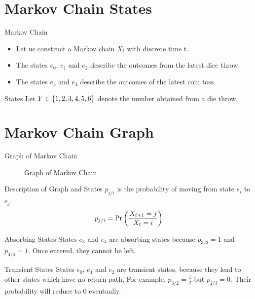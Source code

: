 \documentclass{beamer}
\begin{document}
\section{Markov Chain States}
\begin{frame}{Markov Chain}
\begin{itemize}
    \item  Let us construct a Markov chain $X_t$ with discrete time t.
    \item  The states $e_0$, $e_1$ and $e_2$ describe the outcomes from the latest dice throw.
    \item   The states $e_3$ and $e_4$ describe the outcomes of the latest coin toss.
\end{itemize}
\end{frame}
\begin{frame}{States}
    Let $ Y \in \cbrak{1,2,3,4,5,6} $ denote the number obtained from a die throw. 
    \begin{table}[ht!]
        \centering
    	
        \caption{States in Markov Chain}
        \label{table:States}	
    \end{table}
\end{frame}
\section{Markov Chain Graph}
\begin{frame}{Graph of Markov Chain}
    \begin{figure}[!ht]
        \centering
        \begin{tikzpicture}[->, >= stealth, shorten >=2pt , line width =0.5 pt ,
            node distance =2 cm]
              
        \end{tikzpicture}
        \caption{Graph of Markov Chain}
        \label{fig: markov_chain}
    \end{figure}
\end{frame}
\begin{frame}{Description of Graph and States}
    $p_{j/i}$ is the probability of moving from state $e_i$ to $e_j$.
    \begin{align}
    p_{j/i} = \pr{\frac{ X_{t+1}=j } {X_t=i} }
    \end{align}
    \begin{block}{Absorbing States}
    States $e_3$ and $e_4$ are absorbing states because $p_{3/3}=1$ and $p_{4/4}=1$. Once entered, they cannot be left.
    \end{block}
    \begin{block}{Transient States}
    States $e_0$, $e_1$ and $e_2$ are transient states, because they lead to other states which have no return path, For example, $p_{3/2}=\frac{1}{2}$ but $p_{2/3}= 0$. Their probability will reduce to 0 eventually.
    \end{block}
\end{frame}
\end{document}
